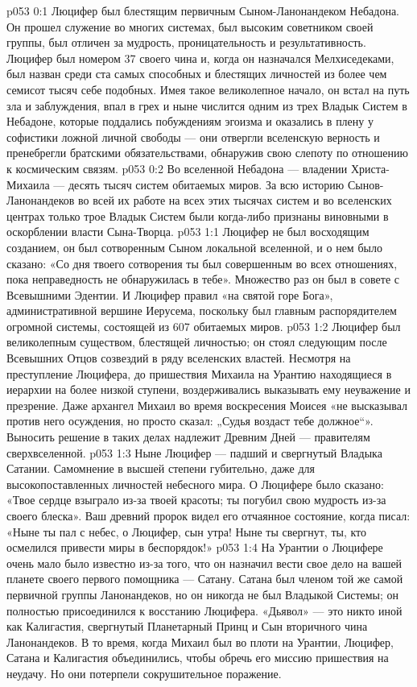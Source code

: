 \vs p053 0:1 Люцифер был блестящим первичным Сыном\hyp{}Ланонандеком Небадона. Он прошел служение во многих системах, был высоким советником своей группы, был отличен за мудрость, проницательность и результативность. Люцифер был номером 37 своего чина и, когда он назначался Мелхиседеками, был назван среди ста самых способных и блестящих личностей из более чем семисот тысяч себе подобных. Имея такое великолепное начало, он встал на путь зла и заблуждения, впал в грех и ныне числится одним из трех Владык Систем в Небадоне, которые поддались побуждениям эгоизма и оказались в плену у софистики ложной личной свободы --- они отвергли вселенскую верность и пренебрегли братскими обязательствами, обнаружив свою слепоту по отношению к космическим связям.
\vs p053 0:2 Во вселенной Небадона --- владении Христа\hyp{}Михаила --- десять тысяч систем обитаемых миров. За всю историю Сынов\hyp{}Ланонандеков во всей их работе на всех этих тысячах систем и во вселенских центрах только трое Владык Систем были когда\hyp{}либо признаны виновными в оскорблении власти Сына\hyp{}Творца.
\vs p053 1:1 Люцифер не был восходящим созданием, он был сотворенным Сыном локальной вселенной, и о нем было сказано: «Со дня твоего сотворения ты был совершенным во всех отношениях, пока неправедность не обнаружилась в тебе». Множество раз он был в совете с Всевышними Эдентии. И Люцифер правил «на святой горе Бога», административной вершине Иерусема, поскольку был главным распорядителем огромной системы, состоящей из 607 обитаемых миров.
\vs p053 1:2 Люцифер был великолепным существом, блестящей личностью; он стоял следующим после Всевышних Отцов созвездий в ряду вселенских властей. Несмотря на преступление Люцифера, до пришествия Михаила на Урантию находящиеся в иерархии на более низкой ступени, воздерживались выказывать ему неуважение и презрение. Даже архангел Михаил во время воскресения Моисея «не высказывал против него осуждения, но просто сказал: „Судья воздаст тебе должное“». Выносить решение в таких делах надлежит Древним Дней --- правителям сверхвселенной.
\vs p053 1:3 Ныне Люцифер --- падший и свергнутый Владыка Сатании. Самомнение в высшей степени губительно, даже для высокопоставленных личностей небесного мира. О Люцифере было сказано: «Твое сердце взыграло из\hyp{}за твоей красоты; ты погубил свою мудрость из\hyp{}за своего блеска». Ваш древний пророк видел его отчаянное состояние, когда писал: «Ныне ты пал с небес, о Люцифер, сын утра! Ныне ты свергнут, ты, кто осмелился привести миры в беспорядок!»
\vs p053 1:4 На Урантии о Люцифере очень мало было известно из\hyp{}за того, что он назначил вести свое дело на вашей планете своего первого помощника --- Сатану. Сатана был членом той же самой первичной группы Ланонандеков, но он никогда не был Владыкой Системы; он полностью присоединился к восстанию Люцифера. «Дьявол» --- это никто иной как Калигастия, свергнутый Планетарный Принц и Сын вторичного чина Ланонандеков. В то время, когда Михаил был во плоти на Урантии, Люцифер, Сатана и Калигастия объединились, чтобы обречь его миссию пришествия на неудачу. Но они потерпели сокрушительное поражение.
